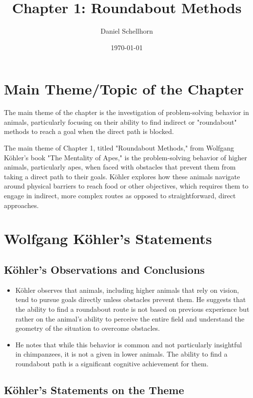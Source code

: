 \documentclass{article}
\title{Chapter 1: Roundabout Methods}
\author{Daniel Schellhorn}
\date{\today}
\begin{document}
\maketitle

\section{Main Theme/Topic of the Chapter}

The main theme of the chapter is the investigation of problem-solving behavior in animals, particularly focusing on their ability to find indirect or "roundabout" methods to reach a goal when the direct path is blocked.

The main theme of Chapter 1, titled "Roundabout Methods," from Wolfgang Köhler's book "The Mentality of Apes," is the problem-solving behavior of higher animals, particularly apes, when faced with obstacles that prevent them from taking a direct path to their goals. Köhler explores how these animals navigate around physical barriers to reach food or other objectives, which requires them to engage in indirect, more complex routes as opposed to straightforward, direct approaches.

\section{Wolfgang Köhler's Statements}

\subsection{Köhler's Observations and Conclusions}

\begin{itemize}
    \item Köhler observes that animals, including higher animals that rely on vision, tend to pursue goals directly unless obstacles prevent them. He suggests that the ability to find a roundabout route is not based on previous experience but rather on the animal's ability to perceive the entire field and understand the geometry of the situation to overcome obstacles.
    \item He notes that while this behavior is common and not particularly insightful in chimpanzees, it is not a given in lower animals. The ability to find a roundabout path is a significant cognitive achievement for them.
\end{itemize}

\subsection{Köhler's Statements on the Theme}
\end{document}
